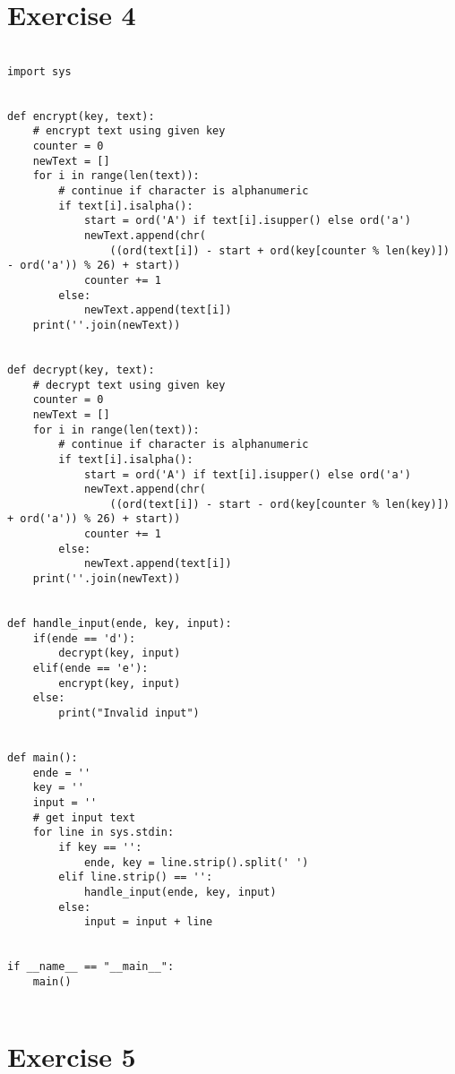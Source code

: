 \documentclass{report}
\begin{document}
\section*{Exercise 4}

\begin{lstlisting}
            
import sys


def encrypt(key, text):
    # encrypt text using given key
    counter = 0
    newText = []
    for i in range(len(text)):
        # continue if character is alphanumeric
        if text[i].isalpha():
            start = ord('A') if text[i].isupper() else ord('a')
            newText.append(chr(
                ((ord(text[i]) - start + ord(key[counter % len(key)]) - ord('a')) % 26) + start))
            counter += 1
        else:
            newText.append(text[i])
    print(''.join(newText))


def decrypt(key, text):
    # decrypt text using given key
    counter = 0
    newText = []
    for i in range(len(text)):
        # continue if character is alphanumeric
        if text[i].isalpha():
            start = ord('A') if text[i].isupper() else ord('a')
            newText.append(chr(
                ((ord(text[i]) - start - ord(key[counter % len(key)]) + ord('a')) % 26) + start))
            counter += 1
        else:
            newText.append(text[i])
    print(''.join(newText))


def handle_input(ende, key, input):
    if(ende == 'd'):
        decrypt(key, input)
    elif(ende == 'e'):
        encrypt(key, input)
    else:
        print("Invalid input")


def main():
    ende = ''
    key = ''
    input = ''
    # get input text
    for line in sys.stdin:
        if key == '':
            ende, key = line.strip().split(' ')
        elif line.strip() == '':
            handle_input(ende, key, input)
        else:
            input = input + line


if __name__ == "__main__":
    main()


\end{lstlisting}

\section*{Exercise 5}
\end{document}

